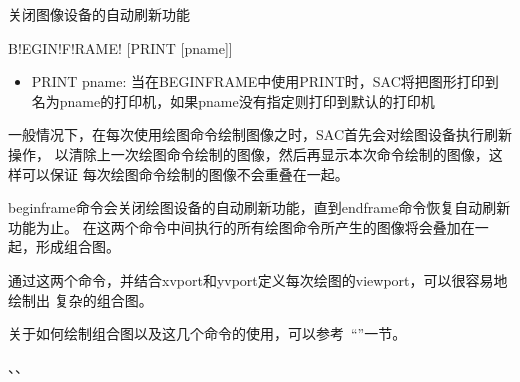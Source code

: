 \label{cmd:beginframe}

关闭图像设备的自动刷新功能

\begin{SACSTX}
B!EGIN!F!RAME! [PRINT [pname]]
\end{SACSTX}

\begin{itemize}
\item PRINT pname: 当在BEGINFRAME中使用PRINT时，SAC将把图形打印到名为pname的打印机，如果pname没有指定则打印到默认的打印机
\end{itemize}

一般情况下，在每次使用绘图命令绘制图像之时，SAC首先会对绘图设备执行刷新操作，
以清除上一次绘图命令绘制的图像，然后再显示本次命令绘制的图像，这样可以保证
每次绘图命令绘制的图像不会重叠在一起。

beginframe命令会关闭绘图设备的自动刷新功能，直到endframe命令恢复自动刷新功能为止。
在这两个命令中间执行的所有绘图命令所产生的图像将会叠加在一起，形成组合图。

通过这两个命令，并结合xvport和yvport定义每次绘图的viewport，可以很容易地绘制出
复杂的组合图。

关于如何绘制组合图以及这几个命令的使用，可以参考~``''一节。

、、
